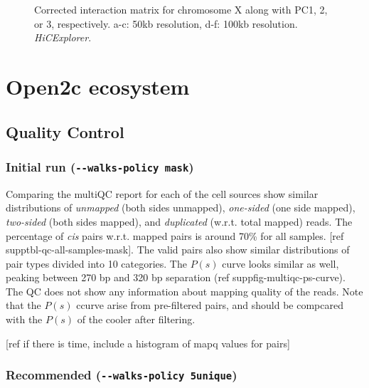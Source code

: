 \documentclass[
  11pt,
  a4paper,
]{scrbook}
\let\oldemph\emph
\renewcommand\emph[1]{\oldemph{\color{gray}#1}}
\begin{document}
\begin{figure}
\begin{minipage}{0.33\linewidth}
{}

\subcaption{\label{fig-explorer-pc3-100kb}}

\end{minipage}%

\caption{\label{fig-explorer-pca}Corrected interaction matrix for
chromosome X along with PC1, 2, or 3, respectively. a-c: 50kb
resolution, d-f: 100kb resolution. \emph{HiCExplorer}.}

\end{figure}%

\section{Open2c ecosystem}\label{open2c-ecosystem}

\subsection{Quality Control}\label{quality-control-1}

\subsubsection{\texorpdfstring{Initial run
(\texttt{-\/-walks-policy\ mask})}{Initial run (-\/-walks-policy mask)}}\label{initial-run---walks-policy-mask}

Comparing the multiQC report for each of the cell sources show similar
distributions of \emph{unmapped} (both sides unmapped), \emph{one-sided}
(one side mapped), \emph{two-sided} (both sides mapped), and
\emph{duplicated} (w.r.t. total mapped) reads. The percentage of
\emph{cis} pairs w.r.t. mapped pairs is around 70\% for all samples.
{[}ref supptbl-qc-all-samples-mask{]}. The valid pairs also show similar
distributions of pair types divided into 10 categories. The \(P(s)\)
curve looks similar as well, peaking between 270 bp and 320 bp
separation (ref suppfig-multiqc-ps-curve). The QC does not show any
information about mapping quality of the reads. Note that the \(P(s)\)
ccurve arise from pre-filtered pairs, and should be compcared with the
\(P(s)\) of the cooler after filtering.

{[}ref if there is time, include a histogram of mapq values for pairs{]}

\subsubsection{\texorpdfstring{Recommended
(\texttt{-\/-walks-policy\ 5unique})}{Recommended (-\/-walks-policy 5unique)}}\label{recommended---walks-policy-5unique}
\end{document}
